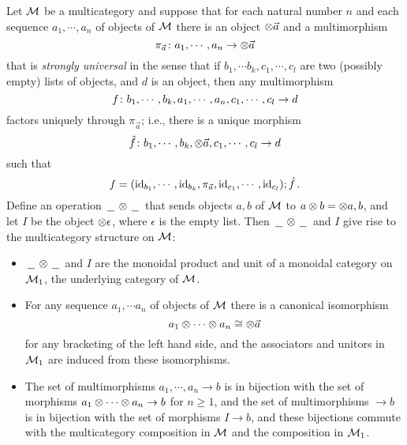 \documentclass{report}[11pt]
\begin{document}
\begin{theorem}
  \label{TheRepresentableMulticategories}
  Let $\mathcal M$ be a multicategory and suppose that for each natural number $n$ and each sequence $a_1,\cdots,a_n$ of objects of $\mathcal M$ there is an object $\otimes \vec{a}$ and a multimorphism
  \[
    \pi_{\vec a} \colon a_1,\cdots,a_n \to \otimes \vec a
    \]
  that is \emph{strongly universal} in the sense that if $b_1,\cdots b_k, c_1,\cdots,c_l$ are two (possibly empty) lists of objects, and $d$ is an object, then any multimorphism
  \[
    f \colon b_1,\cdots,b_k,a_1,\cdots,a_n,c_1,\cdots,c_l \to d
    \]
  factors uniquely through $\pi_{\vec a}$; i.e., there is a unique morphism
  \[
    \hat{f} \colon b_1,\cdots,b_k,\otimes\vec{a},c_1,\cdots,c_l \to d
    \]
  such that
  \[
    f=(\operatorname{id}_{b_1},\cdots,\operatorname{id}_{b_k},\pi_{\vec a},\operatorname{id}_{c_1},\cdots,\operatorname{id}_{c_l});\hat{f}\,.
    \]
  Define an operation $\,\underline{\hspace{1.5ex}}\,\otimes\,\underline{\hspace{1.5ex}}\,$ that sends objects $a,b$ of $\mathcal M$ to $a\otimes b = \otimes a,b$, and let $I$ be the object $\otimes\epsilon$, where $\epsilon$ is the empty list.  
  Then $\,\underline{\hspace{1.5ex}}\,\otimes\,\underline{\hspace{1.5ex}}\,$ and $I$ give rise to the multicategory structure on $\mathcal M$:
  \begin{itemize}
    \item $\,\underline{\hspace{1.5ex}}\,\otimes\,\underline{\hspace{1.5ex}}\,$ and $I$ are the monoidal product and unit of a monoidal category on $\mathcal M_1$, the underlying category of $\mathcal M$.
    \item For any sequence $a_1,\cdots a_n$ of objects of $\mathcal M$ there is a canonical isomorphism
      \[
        a_1 \otimes \cdots \otimes a_n \cong \otimes \vec a
        \]
      for any bracketing of the left hand side, and the associators and unitors in $\mathcal M_1$ are induced from these isomorphisms.
    \item The set of multimorphisms $a_1,\cdots,a_n \to b$ is in bijection with the set of morphisms $a_1\otimes\cdots\otimes a_n \to b$ for $n\ge1$, and the set of multimorphisms $\to b$ is in bijection with the set of morphisms $I \to b$, and these bijections commute with the multicategory composition in $\mathcal M$ and the composition in $\mathcal M_1$.
  \end{itemize}
\end{theorem}
\end{document}
